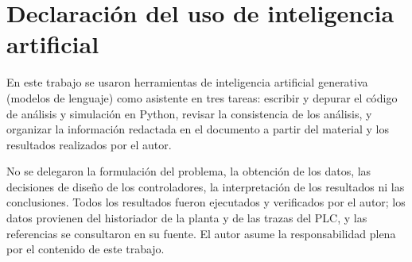 \chapter*{Declaración del uso de inteligencia artificial}

En este trabajo se usaron herramientas de inteligencia artificial generativa
(modelos de lenguaje) como asistente en tres tareas: escribir y depurar el
código de análisis y simulación en Python, revisar la consistencia de los
análisis, y organizar la información redactada en el documento a partir del
material y los resultados realizados por el autor.

No se delegaron la formulación del problema, la obtención de los datos, las
decisiones de diseño de los controladores, la interpretación de los resultados
ni las conclusiones. Todos los resultados fueron ejecutados y verificados por
el autor; los datos provienen del historiador de la planta y de las trazas del
PLC, y las referencias se consultaron en su fuente. El autor asume la
responsabilidad plena por el contenido de este trabajo.
